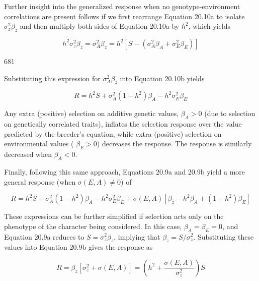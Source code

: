 \documentclass{article}
\begin{document}
Further insight into the generalized response when no genotype-environment correlations are present follows if we first rearrange Equation 20.10a to isolate  $ \sigma_z^2 \beta_z $ and then multiply both sides of Equation 20.10a by  $ h^2 $, which yields

\begin{equation}
h^{2}\sigma_{z}^{2}\beta_{z}=\sigma_{A}^{2}\beta_{z}=h^{2}\left[S-\left(\sigma_{A}^{2}\beta_{A}+\sigma_{E}^{2}\beta_{E}\right)\right]
\tag{20.13a}
\label{eq:20_13a}
\end{equation}

681

Substituting this expression for  $ \sigma_{A}^{2}\beta_{z} $ into Equation 20.10b yields

\begin{equation}
R=h^{2}S+\sigma_{A}^{2}(1-h^{2})\beta_{A}-h^{2}\sigma_{E}^{2}\beta_{E}
\tag{20.13b}
\label{eq:20_13b}
\end{equation}

Any extra (positive) selection on additive genetic values,  $ \beta_A > 0 $ (due to selection on genetically correlated traits), inflates the selection response over the value predicted by the breeder's equation, while extra (positive) selection on environmental values ( $ \beta_E > 0 $) decreases the response. The response is similarly decreased when  $ \beta_A < 0 $.

Finally, following this same approach, Equations 20.9a and 20.9b yield a more general response (when  $ \sigma(E, A) \neq 0 $) of

\begin{equation}
R=h^{2}S+\sigma_{A}^{2}(1-h^{2})\beta_{A}-h^{2}\sigma_{E}^{2}\beta_{E}+\sigma(E,A)\left[\beta_{z}-h^{2}\beta_{A}+(1-h^{2})\beta_{E}\right]
\tag{20.14}
\label{eq:20_14}
\end{equation}

These expressions can be further simplified if selection acts only on the phenotype of the character being considered. In this case,  $ \beta_A = \beta_E = 0 $, and Equation 20.9a reduces to  $ S = \sigma_z^2 \beta_z $, implying that  $ \beta_z = S / \sigma_z^2 $. Substituting these values into Equation 20.9b gives the response as

\begin{equation}
R=\beta_{z}\left[\sigma_{z}^{2}+\sigma(E,A)\right]=\left(h^{2}+\frac{\sigma(E,A)}{\sigma_{z}^{2}}\right)S
\tag{20.15a}
\label{eq:20_15a}
\end{equation}
\end{document}
